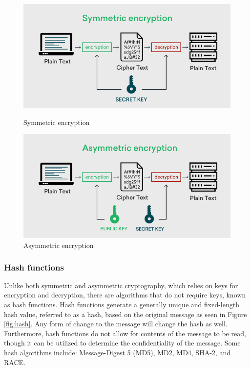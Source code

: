\begin{figure}
    \centering
    \begin{minipage}{.5\textwidth}
        \centering
        \includegraphics[width=.9\textwidth]{../../img/chapter_2/symmetric-cryptography.jpg}
        \caption{Symmetric encryption}\label{fig:sym-crypt}
    \end{minipage}%
    \begin{minipage}{.5\textwidth}
        \centering
        \includegraphics[width=.9\textwidth]{../../img/chapter_2/asymmetric-cryptography.jpg}
        \caption{Asymmetric encryption}\label{fig:asym-crypt}
    \end{minipage}
\end{figure}

\subsubsection{Hash functions}
Unlike both symmetric and asymmetric cryptography, which relies on keys for encryption and decryption, there are algorithms that do not require keys, known as hash functions. Hash functions generate a generally unique and fixed-length hash value, referred to as a hash, based on the original message as seen in Figure \ref{fig:hash}. Any form of change to the message will change the hash as well. Furthermore, hash functions do not allow for  contents of the message to be read, though it can be utilized to determine the confidentiality of the message. Some hash algorithms include: Message-Digest 5 (MD5), MD2, MD4, SHA-2, and RACE. 

